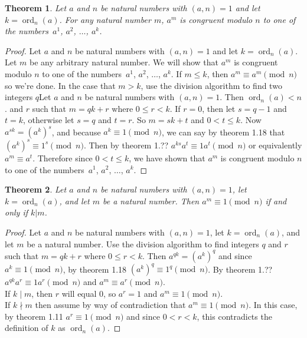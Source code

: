 \documentclass[12pt,leqno]{article}
\numberwithin{equation}{section}
\newtheorem{thm}{Theorem}[section]
\theoremstyle{definition}
\newcommand{\ord}{\operatorname{ord}}
\begin{document}
\pagebreak
\begin{thm}
Let $a$ and $n$ be natural numbers with $(a, n) = 1$ and let $k =
\ord_n(a)$.  For any natural number $m$, $a^m$ is congruent modulo
$n$ to one of the numbers~$a^1$, $a^2$, $\hdots$, $a^k$.
\end{thm}
\begin{proof}[Proof]
Let $a$ and $n$ be natural numbers with $(a, n) = 1$ and let $k = \ord_n(a)$.  Let $m$ be any arbitrary natural number.  We will show that $a^m$ is congruent modulo $n$ to one of the numbers~$a^1$, $a^2$, $\hdots$, $a^k$.  If $m \leq k$, then $a^m \equiv a^m \pmod{n}$ so we're done.  In the case that $m > k$, use the division algorithm to find two integers $q$Let $a$ and $n$ be natural numbers with $(a, n) = 1$. Then
$\ord_n(a) < n$. and $r$ such that $m = qk + r$ where $0 \leq r < k$.  If $r = 0$, then let $s = q - 1$ and $t = k$, otherwise let $s = q$ and $t = r$. So $m = sk + t$ and $0 < t \leq k$.   Now $a^{sk} = (a^k)^s$, and because $a^k \equiv 1 \pmod{n}$, we can say by theorem 1.18 that $(a^k)^s \equiv 1^s \pmod{n}$.  Then by theorem 1.??  $a^{ks}a^t \equiv 1a^t \pmod{n}$ or equivalently $a^m \equiv a^t$.  Therefore since $0 < t \leq k$, we have shown that $a^m$ is congruent modulo $n$ to one of the numbers~$a^1$, $a^2$, $\hdots$, $a^k$.
\end{proof}


\begin{thm}
Let $a$ and $n$ be natural numbers with $(a, n) = 1$, let $k =
\ord_n(a)$, and let $m$ be a natural number.  Then $a^m \equiv 1
\pmod{n}$ if and only if $k|m$.
\end{thm}
\begin{proof}[Proof]
Let $a$ and $n$ be natural numbers with $(a, n) = 1$, let $k = \ord_n(a)$, and let $m$ be a natural number.  Use the division algorithm to find integers $q$ and $r$ such that $m = qk + r$ where $0 \leq r < k$.  Then $a^{qk} = (a^k)^q$ and since $a^k \equiv 1 \pmod{n}$,  by theorem 1.18 $(a^k)^q \equiv 1^q \pmod{n}$.  By theorem 1.??  $a^{qk}a^r \equiv 1a^r \pmod{n}$ and $a^m \equiv a^r \pmod{n}$.\\

 
If $k \mid m$, then $r$ will equal $0$, so $a^r = 1$ and $a^m \equiv 1 \pmod{n}$.\\

If $k \nmid m$ then assume by way of contradiction that $a^m \equiv 1 \pmod{n}$.  In this case, by theorem 1.11 $a^r \equiv 1 \pmod{n}$ and since $0 < r < k$, this contradicts the definition of $k$ as $\ord_n(a)$.
\end{proof}
\end{document}
